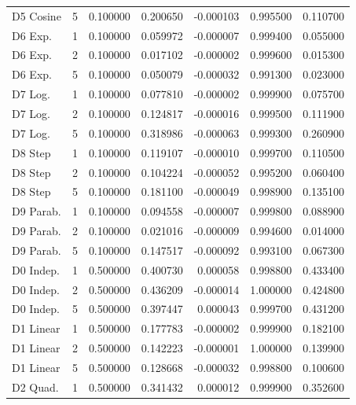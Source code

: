 \begin{tabular}{lrrrrrr}
   D5 Cosine &    5 & 0.100000 &    0.200650 &  -0.000103 & 0.995500 &          0.110700 \\
     D6 Exp. &    1 & 0.100000 &    0.059972 &  -0.000007 & 0.999400 &          0.055000 \\
     D6 Exp. &    2 & 0.100000 &    0.017102 &  -0.000002 & 0.999600 &          0.015300 \\
     D6 Exp. &    5 & 0.100000 &    0.050079 &  -0.000032 & 0.991300 &          0.023000 \\
     D7 Log. &    1 & 0.100000 &    0.077810 &  -0.000002 & 0.999900 &          0.075700 \\
     D7 Log. &    2 & 0.100000 &    0.124817 &  -0.000016 & 0.999500 &          0.111900 \\
     D7 Log. &    5 & 0.100000 &    0.318986 &  -0.000063 & 0.999300 &          0.260900 \\
     D8 Step &    1 & 0.100000 &    0.119107 &  -0.000010 & 0.999700 &          0.110500 \\
     D8 Step &    2 & 0.100000 &    0.104224 &  -0.000052 & 0.995200 &          0.060400 \\
     D8 Step &    5 & 0.100000 &    0.181100 &  -0.000049 & 0.998900 &          0.135100 \\
   D9 Parab. &    1 & 0.100000 &    0.094558 &  -0.000007 & 0.999800 &          0.088900 \\
   D9 Parab. &    2 & 0.100000 &    0.021016 &  -0.000009 & 0.994600 &          0.014000 \\
   D9 Parab. &    5 & 0.100000 &    0.147517 &  -0.000092 & 0.993100 &          0.067300 \\
   D0 Indep. &    1 & 0.500000 &    0.400730 &   0.000058 & 0.998800 &          0.433400 \\
   D0 Indep. &    2 & 0.500000 &    0.436209 &  -0.000014 & 1.000000 &          0.424800 \\
   D0 Indep. &    5 & 0.500000 &    0.397447 &   0.000043 & 0.999700 &          0.431200 \\
   D1 Linear &    1 & 0.500000 &    0.177783 &  -0.000002 & 0.999900 &          0.182100 \\
   D1 Linear &    2 & 0.500000 &    0.142223 &  -0.000001 & 1.000000 &          0.139900 \\
   D1 Linear &    5 & 0.500000 &    0.128668 &  -0.000032 & 0.998800 &          0.100600 \\
    D2 Quad. &    1 & 0.500000 &    0.341432 &   0.000012 & 0.999900 &          0.352600 \\

\end{tabular}
